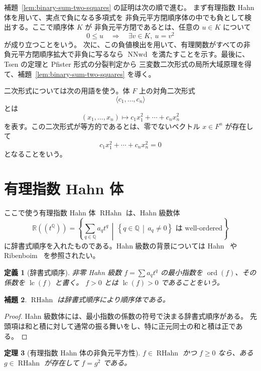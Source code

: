 \documentclass[uplatex,dvipdfmx]{jsarticle}
\newcommand{\RationalHahn}{\operatorname{RHahn}}
\newcommand{\Hahn}{\mathbb{R}((t^{\mathbb{Q}}))}
\newcommand{\lc}{\operatorname{lc}}
\newcommand{\ord}{\operatorname{ord}}
\newcommand{\NNwd}{\operatorname{NNwd}}
\theoremstyle{matrixsosdefinition}
\newtheorem{theorem}{定理}
\newtheorem{lemma}[theorem]{補題}
\newtheorem{definition}[theorem]{定義}
\begin{document}
補題~\ref{lem:binary-sum-two-squares} の証明は次の順で進む。
まず有理指数 Hahn 体を用いて、実点で負になる多項式を
非負元平方閉順序体の中でも負として検出する。ここで順序体 \(K\) が
非負元平方閉であるとは、任意の \(u\in K\) について
\[
  0\le u \quad\Longrightarrow\quad \exists v\in K,\ u=v^2
\]
が成り立つことをいう。
次に、この負値検出を用いて、有理関数がすべての非負元平方閉順序拡大で非負に写るなら
\(\NNwd\) を満たすことを示す。最後に、Tsen の定理と Pfister 形式の分裂判定から
三変数二次形式の局所大域原理を得て、補題~\ref{lem:binary-sum-two-squares} を導く。

二次形式については次の用語を使う。体 \(F\) 上の対角二次形式
\[
  \langle c_1,\ldots,c_n\rangle
\]
とは
\[
  (x_1,\ldots,x_n)\longmapsto c_1x_1^2+\cdots+c_nx_n^2
\]
を表す。この二次形式が等方的であるとは、零でないベクトル \(x\in F^n\) が存在して
\[
  c_1x_1^2+\cdots+c_nx_n^2=0
\]
となることをいう。

\section{有理指数 Hahn 体}\label{sec:hahn-start}

ここで使う有理指数 Hahn 体 \(\RationalHahn\) は、Hahn 級数体
\[
  \Hahn=\left\{\sum_{q\in\mathbb{Q}} a_qt^q \,\middle|\,
    \left\{q\in\mathbb{Q}\,\middle|\, a_q\ne0\right\}\text{ は well-ordered}\right\}
\]
に辞書式順序を入れたものである。Hahn 級数の背景については
Hahn~\cite{Hahn1907} や Ribenboim~\cite{RibenboimFields} を参照されたい。

\begin{definition}[辞書式順序]
  非零 Hahn 級数 \(f=\sum a_qt^q\) の最小指数を \(\ord(f)\)、その係数を \(\lc(f)\) と書く。
  \(f>0\) とは \(\lc(f)>0\) であることをいう。
\end{definition}

\begin{lemma}
  \(\RationalHahn\) は辞書式順序により順序体である。
\end{lemma}

\begin{proof}
  Hahn 級数体には、最小指数の係数の符号で決まる辞書式順序がある。
  先頭項は和と積に対して通常の振る舞いをし、特に正元同士の和と積は正である。
\end{proof}

\begin{theorem}[有理指数 Hahn 体の非負元平方性]
  \(f\in\RationalHahn\) かつ \(f\ge0\) なら、ある \(g\in\RationalHahn\) が存在して
  \(f=g^2\) である。
\end{theorem}
\end{document}
